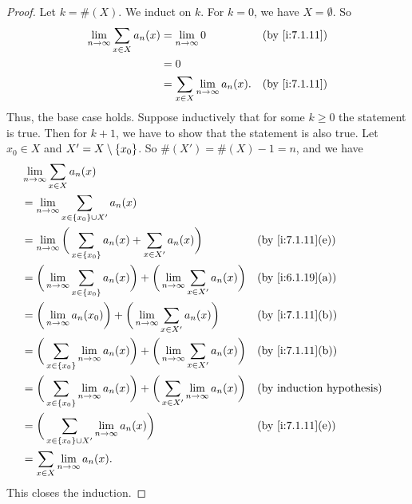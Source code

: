 \begin{proof}
  Let \(k = \#(X)\).
  We induct on \(k\).
  For \(k = 0\), we have \(X = \emptyset\).
  So
  \begin{align*}
    \lim_{n \to \infty} \sum_{x \in X} a_n(x) & = \lim_{n \to \infty} 0                      &  & \by{i:7.1.11} \\
                                              & = 0                                                             \\
                                              & = \sum_{x \in X} \lim_{n \to \infty} a_n(x). &  & \by{i:7.1.11}
  \end{align*}
  Thus, the base case holds.
  Suppose inductively that for some \(k \geq 0\) the statement is true.
  Then for \(k + 1\), we have to show that the statement is also true.
  Let \(x_0 \in X\) and \(X' = X \setminus \left\lbrace x_0\right\rbrace\).
  So \(\#(X') = \#(X) - 1 = n\), and we have
  \begin{align*}
     & \lim_{n \to \infty} \sum_{x \in X} a_n(x)                                                                                                      \\
     & = \lim_{n \to \infty} \sum_{x \in \set{x_0} \cup X'} a_n(x)                                                                                    \\
     & = \lim_{n \to \infty} \bigg(\sum_{x \in \set{x_0}} a_n(x) + \sum_{x \in X'} a_n(x)\bigg)                                 &  & \by{i:7.1.11}[e] \\
     & = \bigg(\lim_{n \to \infty} \sum_{x \in \set{x_0}} a_n(x)\bigg) + \bigg(\lim_{n \to \infty} \sum_{x \in X'} a_n(x)\bigg) &  & \by{i:6.1.19}[a] \\
     & = \bigg(\lim_{n \to \infty} a_n(x_0)\bigg) + \bigg(\lim_{n \to \infty} \sum_{x \in X'} a_n(x)\bigg)                      &  & \by{i:7.1.11}[b] \\
     & = \bigg(\sum_{x \in \set{x_0}} \lim_{n \to \infty} a_n(x)\bigg) + \bigg(\lim_{n \to \infty} \sum_{x \in X'} a_n(x)\bigg) &  & \by{i:7.1.11}[b] \\
     & = \bigg(\sum_{x \in \set{x_0}} \lim_{n \to \infty} a_n(x)\bigg) + \bigg(\sum_{x \in X'} \lim_{n \to \infty} a_n(x)\bigg) &  & \byIH            \\
     & = \bigg(\sum_{x \in \set{x_0} \cup X'} \lim_{n \to \infty} a_n(x)\bigg)                                                  &  & \by{i:7.1.11}[e] \\
     & = \sum_{x \in X} \lim_{n \to \infty} a_n(x).
  \end{align*}
  This closes the induction.
\end{proof}

